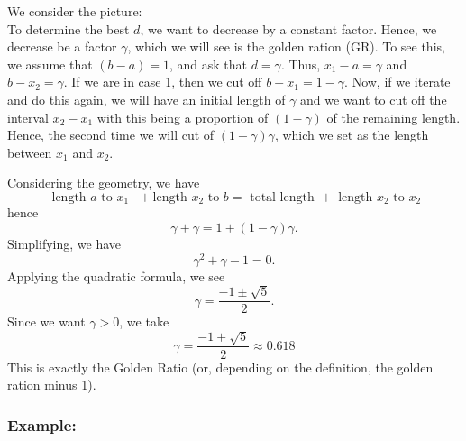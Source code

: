 We consider the picture:\\

To determine the best $d$, we want to decrease by a constant factor.  Hence, we decrease be a factor $\gamma$, which we will see is the golden ration (GR).  To see this, we assume that $(b-a) = 1$, and ask that $d = \gamma$.  Thus, $x_1 - a = \gamma$ and $b - x_2 = \gamma$.  If we are in case 1, then we cut off $b-x_1 = 1-\gamma$.  Now, if we iterate and do this again, we will have an initial length of $\gamma$ and we want to cut off the interval $x_2 - x_1$ with this being a proportion of $(1-\gamma)$ of the remaining length.  Hence, the second time we will cut of $(1-\gamma)\gamma$, which we set as the length between $x_1$ and $x_2$.  

Considering the geometry, we have
$$
\text{ length $a$ to $x_1$ } + \text{length $x_2$ to $b$} = \text{ total length } + \text{ length $x_2$ to $x_2$}
$$ 
hence
$$
\gamma + \gamma = 1 + (1-\gamma)\gamma.
$$
Simplifying, we have
$$
\gamma^2 + \gamma - 1 = 0.
$$
Applying the quadratic formula, we see
$$
\gamma = \frac{-1 \pm \sqrt{5}}{2}.
$$
Since we want $\gamma > 0$, we take 
$$
\gamma = \frac{-1 + \sqrt{5}}{2} \approx 0.618
$$
This is exactly the Golden Ratio (or, depending on the definition, the golden ration minus 1).



\subsubsection{Example:}

